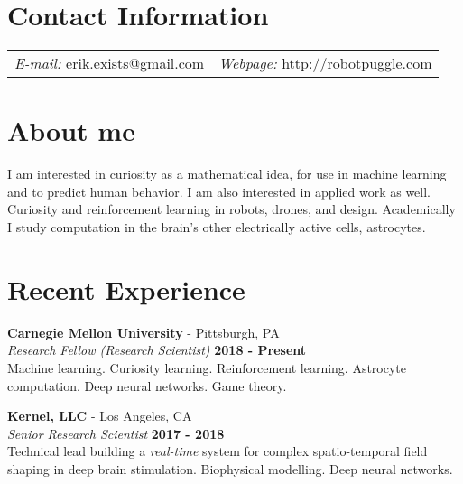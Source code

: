 \documentclass[margin,line]{res}
\begin{document}
\newcommand{\link}[1]{\texttt{#1}}
\providecommand{\tightlist}{%
    \setlength{\itemsep}{0pt}\setlength{\parskip}{0pt}}



\begin{resume}
\section{\sc Contact Information}
\vspace{.05in}

\begin{tabular}{@{}p{2in}p{4in}}
{\it E-mail:}  erik.exists@gmail.com   & {\it Webpage:} \href{http://robotpuggle.com}{http://robotpuggle.com} \\
\end{tabular}

\section{\sc About me}
I am interested in curiosity as a mathematical idea, for use in machine learning and to predict human behavior. I am also interested in applied work as well. Curiosity and reinforcement learning in robots, drones, and design. Academically I study computation in the brain’s other electrically active cells, astrocytes. 

\section{\sc Recent Experience}
\vspace{-.1cm}
{\bf Carnegie Mellon University} - Pittsburgh, PA \\
{\em Research Fellow (Research Scientist)} \hfill {\bf 2018 - Present}\\
Machine learning. Curiosity learning. Reinforcement learning. Astrocyte computation. Deep neural networks. Game theory.

\vspace{-.1cm}
{\bf Kernel, LLC} - Los Angeles, CA\\
{\em Senior Research Scientist} \hfill {\bf 2017 - 2018}\\
Technical lead building a \emph{real-time} system for complex spatio-temporal field shaping in deep brain stimulation. Biophysical modelling. Deep neural networks.


\end{resume}
\end{document}
